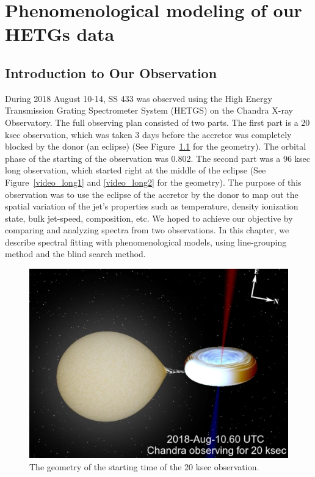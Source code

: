 \chapter{Phenomenological modeling of our HETGs data}
\section{Introduction to Our Observation}
During 2018 August 10-14, SS 433 was observed using the High Energy Transmission Grating Spectrometer System (HETGS) on the Chandra X-ray Observatory. The full observing plan consisted of two parts. The first part is a 20 ksec observation, which was taken 3 days before the accretor was completely blocked by the donor (an eclipse) (See Figure~\ref{video_short} for the geometry). The orbital phase of the starting of the observation was 0.802. The second part was a 96 ksec long observation, which started right at the middle of the eclipse (See Figure~\ref{video_long1} and \ref{video_long2} for the geometry). The purpose of this observation was to use the eclipse of the accretor by the donor to map out the spatial variation of the jet's properties such as temperature, density ionization state, bulk jet-speed, composition, etc. We hoped to achieve our objective by comparing and analyzing spectra from two observations. In this chapter, we describe spectral fitting with phenomenological models, using line-grouping method and the blind search method. \par 


\begin{figure}
    \centering
    \includegraphics[scale = 0.2]{Chapters/Figures/video_short.png}
    \caption{The geometry of the starting time of the 20 ksec observation.}
    \label{video_short}
\end{figure}

